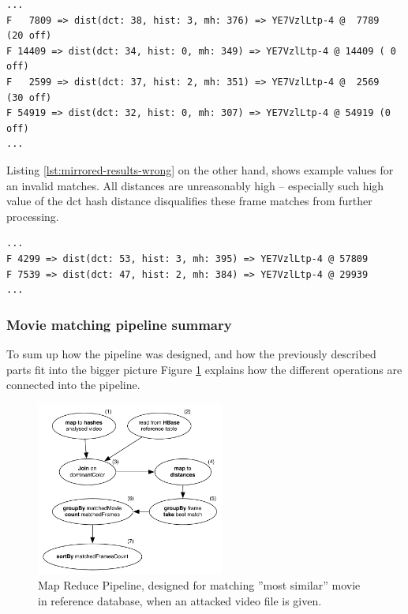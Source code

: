 \begin{lstlisting}[caption={Examples of valid ''best'' matches for a few sample frames (mirrored movie).}, label={lst:mirrored-results}]
...
F   7809 => dist(dct: 38, hist: 3, mh: 376) => YE7VzlLtp-4 @  7789   (20 off)
F 14409 => dist(dct: 34, hist: 0, mh: 349) => YE7VzlLtp-4 @ 14409 ( 0 off)
F   2599 => dist(dct: 37, hist: 2, mh: 351) => YE7VzlLtp-4 @  2569   (30 off)
F 54919 => dist(dct: 32, hist: 0, mh: 307) => YE7VzlLtp-4 @ 54919 (0 off)
...
\end{lstlisting}

Listing \ref{lst:mirrored-results-wrong} on the other hand, shows example values for an invalid matches. All distances are unreasonably high -- especially such high value of the dct hash distance disqualifies these frame matches from further processing.

\begin{lstlisting}[caption={Examples of invalid matches for a few sample frames.}, label={lst:mirrored-results-wrong}]
...
F 4299 => dist(dct: 53, hist: 3, mh: 395) => YE7VzlLtp-4 @ 57809
F 7539 => dist(dct: 47, hist: 2, mh: 384) => YE7VzlLtp-4 @ 29939
...
\end{lstlisting}


\subsubsection{Movie matching pipeline summary}
To sum up how the pipeline was designed, and how the previously described parts fit into the bigger picture Figure \ref{fig:full-job} explains how the different operations are connected into the pipeline.

\begin{figure}[ch!]
  \centering
  \includegraphics[width=0.55\textwidth]{img/top-match-job}
  \caption{Map Reduce Pipeline, designed for matching ''most similar'' movie in reference database, when an attacked video file is given.}
  \label{fig:full-job}
\end{figure}

